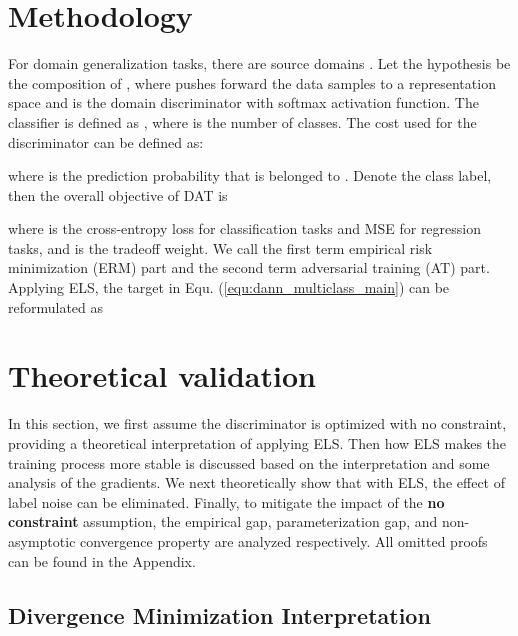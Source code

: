 \documentclass{article} \usepackage{iclr2023_conference,times}
\newcommand{\ls}[0]{ELS\xspace}
\newcommand{\myref}[1]{Equ. (\ref{#1})}
\begin{document}
\vspace{-0.1cm}
\section{Methodology}
\vspace{-0.1cm}


For domain generalization tasks, there are  source domains . Let the hypothesis  be the composition of , where  pushes forward the data samples to a representation space  and  is the domain discriminator with softmax activation function. The classifier is defined as , where  is the number of classes. The cost used for the discriminator can be defined as:

where  is the prediction probability that  is belonged to . Denote  the class label, then the overall objective of DAT is

where  is the cross-entropy loss for classification tasks and MSE for regression tasks, and  is the tradeoff weight. We call the first term empirical risk minimization (ERM) part and the second term adversarial training (AT) part.
Applying \ls, the target in \myref{equ:dann_multiclass_main} can be reformulated as


\vspace{-0.1cm}
\section{Theoretical validation}
\vspace{-0.1cm}
In this section, we first assume the discriminator is optimized with no constraint, providing a theoretical interpretation of applying \ls. Then how \ls makes the training process more stable is discussed based on the interpretation and some analysis of the gradients. We next theoretically show that with \ls, the effect of label noise can be eliminated. Finally, to mitigate the impact of the \textbf{no constraint} assumption, the empirical gap, parameterization gap, and non-asymptotic convergence property are analyzed respectively. All omitted proofs can be found in the Appendix.
\subsection{Divergence Minimization Interpretation}\label{sec:js}
\end{document}
